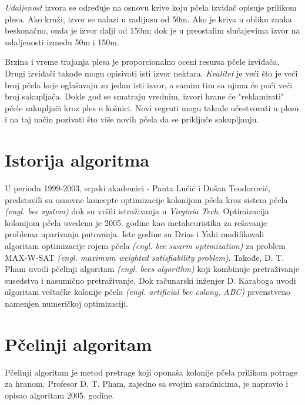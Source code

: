 \documentclass[a4paper]{article}
\begin{document}
{{\em Udaljenost} izvora se određuje na osnovu krive koju pčela izviđač opisuje prilikom plesa. Ako kruži, izvor se nalazi u radijusu od 50m. Ako je kriva u obliku znaka beskonačno, onda je izvor dalji od 150m; dok je u preostalim slučajevima izvor na udaljenosti između 50m i 150m\cite{plespcela}.

Brzina i vreme trajanja plesa je proporcionalno oceni resursa pčele izviđača. Drugi izviđači takođe mogu opisivati isti izvor nektara. {\em Kvalitet} je veći što je veći broj pčela koje oglašavaju za jedan isti izvor, a samim tim sa njima će poći veći broj sakupljača\cite{bcoalg}. Dokle god se smatraju vrednim, izvori hrane će "reklamirati" pčele sakupljači kroz ples u košnici. Novi regruti mogu takođe učestvovati u plesu i na taj način pozivati što više novih pčela da se priključe sakupljanju. 

\section{Istorija algoritma}
U periodu 1999-2003, srpski akademici - Panta Lučić i Dušan Teodorović, predstavili su osnovne koncepte optimizacije kolonijom pčela kroz sistem pčela {\em(engl. bee system)} dok su vršili istraživanja u {\em Virginia Tech}\cite{algoritam}. Optimizacija kolonijom pčela uvedena je 2005. godine kao metaheuristika za rešavanje problema uparivanja putovanja. Iste godine su Drias i
Yahi modifikovali algoritam optimizacije rojem pčela {\em(engl. bee swarm optimization)} za
problem MAX-W-SAT {\em(engl. maximum weighted satisfiability problem)}. Takođe, D. T. Pham uvodi pčelinji algoritam {\em(engl. bees algorithm)} koji kombinuje
pretraživanje susedstva i nasumično pretraživanje\cite{istorijat}. Dok računarski inženjer D. Karaboga uvodi algoritam veštačke kolonije pčela {\em(engl. artificial bee colony, ABC)} prvenstveno
namenjen numeričkoj optimizaciji.


\section{Pčelinji algoritam}
Pčelinji algoritam je metod pretrage koji oponaša kolonije pčela prilikom potrage za hranom\cite{sajt_algoritma}. Profesor D. T. Pham, zajedno sa svojim saradnicima, je napravio i opisao algoritam 2005. godine.

}
\end{document}
